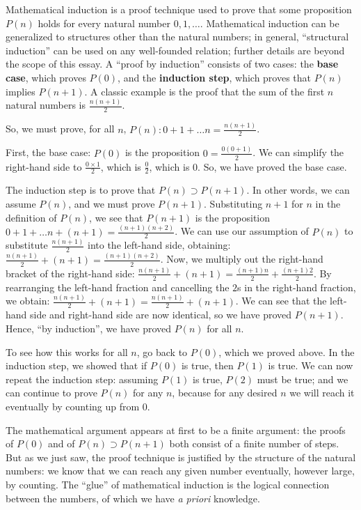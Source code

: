 \documentclass[english]{scrartcl}
\begin{document}
Mathematical induction is a proof technique used to prove that some proposition $P(n)$ holds for every natural number $0, 1,…$. Mathematical induction can be generalized to structures other than the natural numbers; in general, “structural induction” can be used on any well-founded relation; further details are beyond the scope of this essay. A “proof by induction” consists of two cases: the \textbf{base case}, which proves $P(0)$, and the \textbf{induction step}, which proves that $P(n)$ implies $P(n+1)$. A classic example is the proof that the sum of the first $n$ natural numbers is $\frac{n(n+1)}{2}$.

So, we must prove, for all $n$, $P(n): 0+1+…n = \frac{n(n+1)}{2}$.

First, the base case: $P(0)$ is the proposition $0 = \frac{0(0+1)}{2}$. We can simplify the right-hand side to $\frac{0×1}{2}$, which is $\frac{0}{2}$, which is $0$. So, we have proved the base case.

The induction step is to prove that $P(n)\supset P(n+1)$. In other words, we can assume $P(n)$, and we must prove $P(n+1)$. Substituting $n+1$ for $n$ in the definition of $P(n)$, we see that $P(n+1)$ is the proposition $0+1+…n+(n+1) = \frac{(n+1)(n+2)}{2}$. We can use our assumption of $P(n)$ to substitute $\frac{n(n+1)}{2}$ into the left-hand side, obtaining: $\frac{n(n+1)}{2}+(n+1) = \frac{(n+1)(n+2)}{2}$. Now, we multiply out the right-hand bracket of the right-hand side: $\frac{n(n+1)}{2}+(n+1) = \frac{(n+1)n}{2} + \frac{(n+1)2}{2}$. By rearranging the left-hand fraction and cancelling the $2$s in the right-hand fraction, we obtain: $\frac{n(n+1)}{2}+(n+1) = \frac{n(n+1)}{2} + (n+1)$. We can see that the left-hand side and right-hand side are now identical, so we have proved $P(n+1)$. Hence, “by induction”, we have proved $P(n)$ for all $n$.

To see how this works for all $n$, go back to $P(0)$, which we proved above. In the induction step, we showed that if $P(0)$ is true, then $P(1)$ is true. We can now repeat the induction step: assuming $P(1)$ is true, $P(2)$ must be true; and we can continue to prove $P(n)$ for any $n$, because for any desired $n$ we will reach it eventually by counting up from $0$.

The mathematical argument appears at first to be a finite argument: the proofs of $P(0)$ and of $P(n)\supset P(n+1)$ both consist of a finite number of steps. But as we just saw, the proof technique is justified by the structure of the natural numbers: we know that we can reach any given number eventually, however large, by counting. The “glue” of mathematical induction is the logical connection between the numbers, of which we have \emph{a priori} knowledge.
\end{document}
